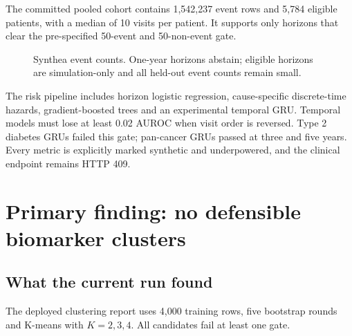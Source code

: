\documentclass[11pt,a4paper]{article}
\begin{document}
The committed pooled cohort contains 1,542,237 event rows and 5,784 eligible
patients, with a median of 10 visits per patient. It supports only horizons that
clear the pre-specified 50-event and 50-non-event gate.

\begin{figure}[H]
\centering
{}
\caption{Synthea event counts. One-year horizons abstain; eligible horizons are
simulation-only and all held-out event counts remain small.}
\label{fig:risk-events}
\end{figure}

The risk pipeline includes horizon logistic regression, cause-specific
discrete-time hazards, gradient-boosted trees and an experimental temporal GRU.
Temporal models must lose at least 0.02 AUROC when visit order is reversed.
Type 2 diabetes GRUs failed this gate; pan-cancer GRUs passed at three and five
years. Every metric is explicitly marked synthetic and underpowered, and the
clinical endpoint remains HTTP 409.

\section{Primary finding: no defensible biomarker clusters}

\subsection{What the current run found}

The deployed clustering report uses 4,000 training rows, five bootstrap rounds
and K-means with \(K=2,3,4\). All candidates fail at least one gate.
\end{document}

